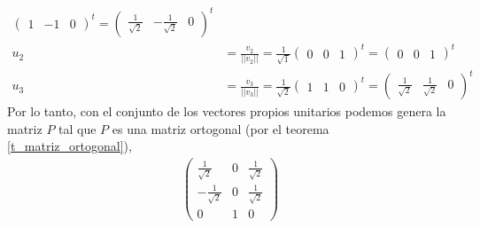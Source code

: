 \documentclass[11pt,letterpaper]{article}
\begin{document}
\begin{enumerate}
\begin{align*}
\begin{pmatrix}
1 & -1 & 0
\end{pmatrix}^t = \begin{pmatrix}
 \frac{1}{\sqrt{2}} & -\frac{1}{\sqrt{2}} & 0
\end{pmatrix}^t\\
u_2&= \frac{v_2}{||v_2||} =\frac{1}{\sqrt{1}} \begin{pmatrix}
0 & 0 & 1
\end{pmatrix}^t = \begin{pmatrix}
 0 & 0 & 1
\end{pmatrix}^t\\
u_3&= \frac{v_3}{||v_3||} =\frac{1}{\sqrt{2}} \begin{pmatrix}
1 & 1 & 0
\end{pmatrix}^t = \begin{pmatrix}
 \frac{1}{\sqrt{2}} & \frac{1}{\sqrt{2}} & 0
\end{pmatrix}^t
\end{align*}
Por lo tanto, con el conjunto de los vectores propios unitarios podemos genera la matriz $P$ tal que $P$ es una matriz ortogonal (por el teorema \ref{t_matriz_ortogonal}),
\begin{align*}
\begin{pmatrix}
\frac{1}{\sqrt{2}} & 0 & \frac{1}{\sqrt{2}} \\
-\frac{1}{\sqrt{2}} & 0 & \frac{1}{\sqrt{2}}\\
0 & 1 & 0
\end{pmatrix}
\end{align*}


\end{enumerate}
\end{document}
